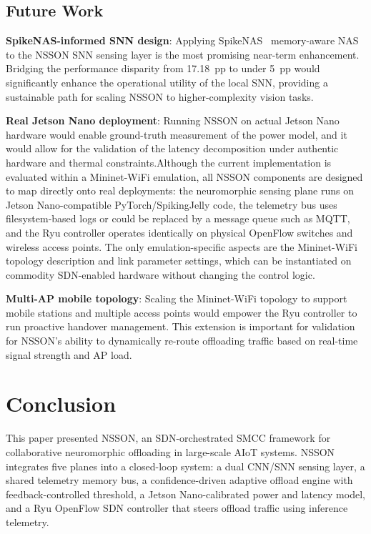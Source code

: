 \documentclass[journal]{IEEEtran}
\newcommand{\revblue}[1]{\textcolor{revblue}{#1}}
\begin{document}
\subsection{Future Work}

\textbf{SpikeNAS-informed SNN design}: Applying SpikeNAS~\cite{putra2025spikenas} memory-aware NAS to the NSSON SNN sensing layer is the most promising near-term enhancement. Bridging the performance disparity from 17.18~pp to under 5~pp would significantly enhance the operational utility of the local SNN, providing a sustainable path for scaling NSSON to higher-complexity vision tasks.

\textbf{Real Jetson Nano deployment}: Running NSSON on actual Jetson Nano hardware would enable ground-truth measurement of the power model, and it would allow for the validation of the latency decomposition under authentic hardware and thermal constraints.\revblue{Although the current implementation is evaluated within a
Mininet-WiFi emulation, all NSSON components are designed to map
directly onto real deployments: the neuromorphic sensing plane runs on
Jetson Nano-compatible PyTorch/SpikingJelly code, the telemetry bus uses
filesystem-based logs or could be replaced by a message queue such as
MQTT, and the Ryu controller operates identically on physical OpenFlow
switches and wireless access points. The only emulation-specific aspects
are the Mininet-WiFi topology description and link parameter settings,
which can be instantiated on commodity SDN-enabled hardware without
changing the control logic.}

\textbf{Multi-AP mobile topology}: Scaling the Mininet-WiFi topology to support mobile stations and multiple access points would empower the Ryu controller to run proactive handover management. This extension is important for validation for NSSON's ability to dynamically re-route offloading traffic based on real-time signal strength and AP load.

\section{Conclusion}
\label{sec:conclusion}

This paper presented NSSON, an SDN-orchestrated SMCC framework for
collaborative neuromorphic offloading in large-scale AIoT systems.
NSSON integrates five planes into a closed-loop system: a dual CNN/SNN
sensing layer, a shared telemetry memory bus, a confidence-driven adaptive
offload engine with feedback-controlled threshold, a Jetson Nano-calibrated
power and latency model, and a Ryu OpenFlow SDN controller that steers
offload traffic using inference telemetry.
\end{document}
